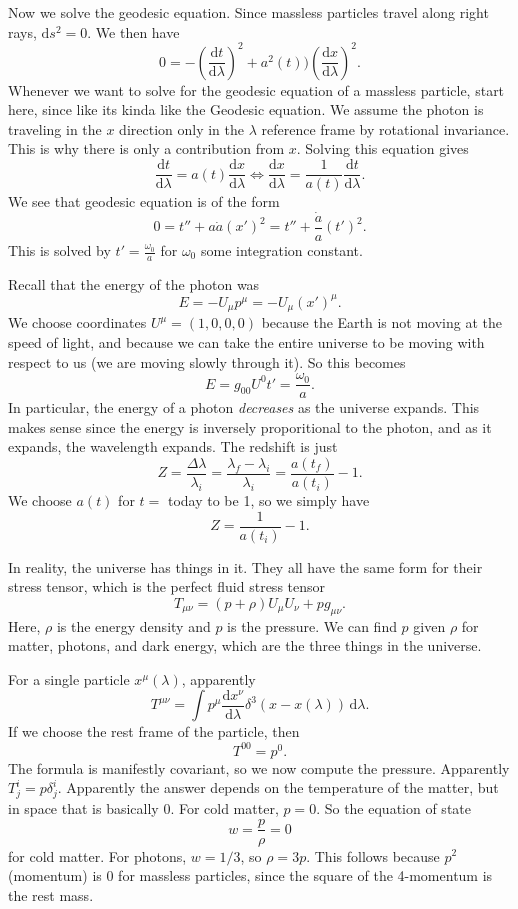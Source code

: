 Now we solve the geodesic equation. Since massless particles travel along right rays, $\mathrm{d} s^2=0$. We then have
\[
	0=-\left( \frac{\mathrm{d}t}{\mathrm{d}\lambda }  \right) ^2+a^2(t))\left( \frac{\mathrm{d}x}{\mathrm{d}\lambda }  \right) ^2
.\]
Whenever we want to solve for the geodesic equation of a massless particle, start here, since like its kinda like the Geodesic equation. We assume the photon is traveling in the $x$ direction only in the $\lambda $ reference frame by rotational invariance. This is why there is only a contribution from $x$. Solving this equation gives
\[
	\frac{\mathrm{d}t}{\mathrm{d}\lambda } =a(t)\frac{\mathrm{d}x}{\mathrm{d}\lambda } \iff \frac{\mathrm{d}x}{\mathrm{d}\lambda } =\frac{1}{a(t)} \frac{\mathrm{d}t}{\mathrm{d}\lambda } 
.\]
We see that geodesic equation is of the form
\[
	0=t''+a \dot{a} (x')^2=t''+\frac{\dot{a} }{a} (t')^2
.\]
This is solved by $t'=\frac{\omega _0}{a} $ for $\omega _0$ some integration constant.

Recall that the energy of the photon was
\[
	E=-U_\mu p^\mu =-U_\mu (x')^\mu 
.\]
We choose coordinates $U^\mu =(1,0,0,0)$ because the Earth is not moving at the speed of light, and because we can take the entire universe to be moving with respect to us (we are moving slowly through it). So this becomes
\[
	E=g_{00} U^0 t'=\frac{\omega _0}{a} 
.\]
In particular, the energy of a photon \emph{decreases} as the universe expands. This makes sense since the energy is inversely proporitional to the photon, and as it expands, the wavelength expands. The redshift is just
\[
	Z=\frac{\Delta \lambda }{\lambda _i} =\frac{\lambda _f-\lambda _i}{\lambda _i} =\frac{a(t_f)}{a(t_i)} -1
.\]
We choose $a(t)$ for $t=$ today to be 1, so we simply have
\[
	Z=\frac{1}{a(t_i)} -1
.\]

In reality, the universe has things in it. They all have the same form for their stress tensor, which is the perfect fluid stress tensor
\[
	T_{\mu \nu } =\left( p+\rho  \right) U_\mu U_\nu +pg_{\mu \nu } 
.\]
Here, $\rho $ is the energy density and $p$ is the pressure. We can find $p$ given $\rho $ for matter, photons, and dark energy, which are the three things in the universe.

For a single particle $x^\mu (\lambda )$, apparently
\[
	T^{\mu \nu } =\int p^\mu \frac{\mathrm{d}x^\nu }{\mathrm{d}\lambda } \delta ^3(x-x(\lambda )) \,\mathrm{d} \lambda 
.\]
If we choose the rest frame of the particle, then
\[
	T^{00} =p^0
.\]
The formula is manifestly covariant, so we now compute the pressure. Apparently $T^i_j=p\delta ^i_j$. Apparently the answer depends on the temperature of the matter, but in space that is basically 0. For cold matter, $p=0$. So the equation of state
\[
	w=\frac{p}{\rho } =0
\]
for cold matter. For photons, $w=1/3$, so $\rho =3p$. This follows because $p^2$ (momentum) is 0 for massless particles, since the square of the 4-momentum is the rest mass.

